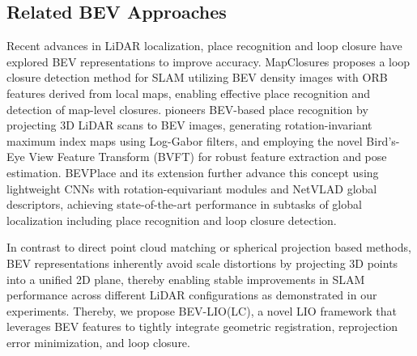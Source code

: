\vspace{-1.5mm}
\subsection{Related BEV Approaches}
\vspace{-1mm}
Recent advances in LiDAR localization, place recognition and loop closure have explored BEV representations to improve accuracy.
MapClosures \cite{MapClosures} proposes a loop closure detection method for SLAM utilizing BEV density images with ORB features derived from local maps, enabling effective place recognition and detection of map-level closures. 
\cite{BVMatch} pioneers BEV-based place recognition by projecting 3D LiDAR scans to BEV images, generating rotation-invariant maximum index maps using Log-Gabor filters, and employing the novel Bird’s-Eye View Feature Transform (BVFT) for robust feature extraction and pose estimation. 
BEVPlace \cite{BEVPlace} and its extension \cite{BEVPlace++} further advance this concept using lightweight CNNs with rotation-equivariant modules and NetVLAD \cite{NetVLAD} global descriptors, achieving state-of-the-art performance in subtasks of global localization including place recognition and loop closure detection.
\par In contrast to direct point cloud matching or spherical projection based methods, BEV representations inherently avoid scale distortions by projecting 3D points into a unified 2D plane, thereby enabling stable improvements in SLAM performance across different LiDAR configurations as demonstrated in our experiments. Thereby, we propose BEV-LIO(LC), a novel LIO framework that leverages BEV features to tightly integrate geometric registration, reprojection error minimization, and loop closure.
\vspace{-0.5mm}


